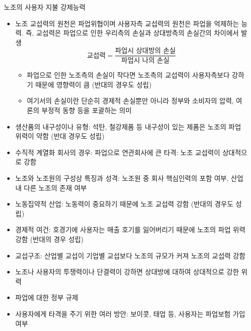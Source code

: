 \documentclass[aspectratio=169,xcolor=dvipsnames,handout]{beamer}
\begin{document}
\begin{frame}[allowframebreaks]{노조의 사용자 지불 강제능력}
    \begin{itemize}[<+->]
        \item 노조 교섭력의 원천은 파업위협이며 사용자측 교섭력의 원천은 파업을 억제하는 능력. 즉, 교섭력은 파업으로 인한 우리측의 손실과 상대방측의 손실간의 차이에서 발생
            \[\text{교섭력} = \frac{\text{파업시 상대방의 손실}}{\text{파업시 나의 손실}}\]
        \begin{itemize}[<+->]
            \item 파업으로 인한 노조측의 손실이 작다면 노조측의 교섭력이 사용자측보다 강하기 때문에 영향력이 큼 (반대의 경우도 성립)
            \item 여기서의 손실이란 단순히 경제적 손실뿐만 아니라 정부와 소비자의 압력, 여론의 부정적 동향 등을 포괄하는 의미
        \end{itemize}
        \item 생산품의 내구성이나 유형: 석탄, 철강제품 등 내구성이 있는 제품은 노조의 파업 위력이 약함 (반대 경우도 성립)
        \item 수직적 계열화 회사의 경우: 파업으로 연관회사에 큰 타격: 노조 교섭력이 상대적으로 강함 
        \item 노조와 노조원의 구성상 특징과 성격: 노조원 중 회사 핵심인력의 포함 여부, 산업 내 다른  노조의 존재 여부
        \item 노동집약적 산업: 노동력이 중요하기 때문에 노조 교섭력 강함 (반대의 경우도 성립)
        \item 경제적 여건: 호경기에 사용자는 매출 호기를 잃어버리기 때문에 노조의 파업 위력 강함 (반대의 경우 성립)
        \item 교섭구조: 산업별 교섭이 기업별 교섭보다 노조의 규모가 커져 노조의 교섭력 강함
        \item 노조나 사용자의 투쟁력이나 단결력이 강하면 상대방에 대하여 상대적으로 강한 위력
        \item 파업에 대한 정부 규제
        \item 사용자에게 타격을 주기 위한 여러 방안: 보이콧, 태업 등, 사용자는 파업보험 가입 여부
    \end{itemize}
\end{frame}

\end{document}
